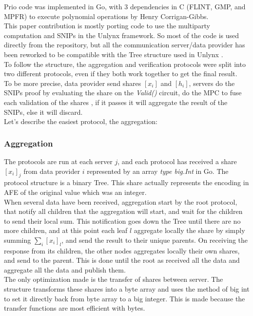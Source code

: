 \documentclass{article}
\begin{document}
Prio code \cite{priocode} was implemented in Go, with 3 dependencies in C (FLINT, GMP, and MPFR) to execute polynomial operations by Henry Corrigan-Gibbs.\\
This paper contribution is mostly porting code to use the multiparty computation and SNIPs in the Unlynx framework. So most of the code is used directly from the repository, but all the communication server/data provider has been reworked to be compatible with the Tree structure used in Unlynx \cite{unlynxcode}.\\
To follow the structure, the aggregation and verification protocols were split into two different protocols, even if they both work together to get the final result.\\
To be more precise, data provider send shares $[x_i]$ and $[h_i]$, servers do the SNIPs proof by evaluating the share on the \textit{Valid()} circuit, do the MPC to fuse each validation of the shares , if it passes it will aggregate the result of the SNIPs, else it will discard.\\
Let's describe the easiest protocol, the aggregation:\\
\subsubsection*{Aggregation}
The protocols are run at each server $j$, and each protocol has received a share $[x_i]_j$ from data provider $i$ represented by an array \textit{type big.Int} in Go. The protocol structure is a binary Tree.
This share actually represents the encoding in AFE of the original value which was an integer.\\

When several data have been received, aggregation start by the root protocol, that notify all children that the aggregation will start, and wait for the children to send their local sum. This notification goes down the Tree until there are no more children, and at this point each leaf $l$ aggregate locally the share by simply summing $\sum_{i}[x_i]_l$, and send the result to their unique parents. On receiving the response from its children, the other nodes aggregates locally their own shares, and send to the parent. This is done until the root as received all the data and aggregate all the data and publish them.\\
The only optimization made is the transfer of shares between server. The structure transforms these shares into a byte array and uses the method of big int to set it directly back from byte array to a big integer. This is made because the transfer functions are most efficient with bytes.\\
\end{document}
